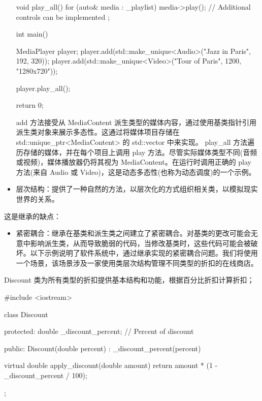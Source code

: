 \begin{itemize}
\begin{cpp}
{    void play_all() {
        for (auto& media : _playlist) {
            media->play();
            // Additional controls can be implemented
        }
    }
};

int main() {
    MediaPlayer player;
    player.add(std::make_unique<Audio>("Jazz in Paris", 192, 320));
    player.add(std::make_unique<Video>("Tour of Paris", 1200, "1280x720"));

    player.play_all();

    return 0;
}
\end{cpp}

add 方法接受从 MediaContent 派生类型的媒体内容，通过使用基类指针引用派生类对象来展示多态性。这通过将媒体项目存储在 std::unique\_ptr<MediaContent> 的 std::vector 中来实现。 play\_all 方法遍历存储的媒体，并在每个项目上调用 play 方法。尽管实际媒体类型不同(音频或视频)，媒体播放器仍将其视为 MediaContent。在运行时调用正确的 play 方法(来自 Audio 或 Video)，这是动态多态性(也称为动态调度)的一个示例。

\item
层次结构：提供了一种自然的方法，以层次化的方式组织相关类，以模拟现实世界的关系。
\end{itemize}

这是继承的缺点：

\begin{itemize}
\item
紧密耦合：继承在基类和派生类之间建立了紧密耦合。对基类的更改可能会无意中影响派生类，从而导致脆弱的代码，当修改基类时，这些代码可能会被破坏。以下示例说明了软件系统中，通过继承实现的紧密耦合问题。我们将使用一个场景，该场景涉及一家使用类层次结构管理不同类型的折扣的在线商店。
\end{itemize}


Discount 类为所有类型的折扣提供基本结构和功能，根据百分比折扣计算折扣；

\begin{cpp}
#include <iostream>

class Discount {
protected:
    double _discount_percent; // Percent of discount

public:
    Discount(double percent) : _discount_percent(percent) {}

    virtual double apply_discount(double amount) {
        return amount * (1 - _discount_percent / 100);
    }
};
\end{cpp}


